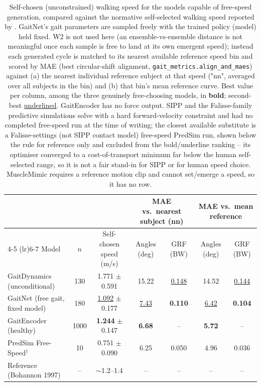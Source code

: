 \begin{table}[t]
\centering
\caption{Self-chosen (unconstrained) walking speed for the models capable of
free-speed generation, compared against the normative self-selected walking
speed reported by \citet{bohannon1997}. GaitNet's gait parameters are sampled
freely with the trained policy (model) held fixed. W2 is not used here (an
ensemble-vs-ensemble distance is not meaningful once each sample is free to
land at its own emergent speed); instead each generated cycle is matched to
its nearest available reference speed bin and scored by MAE (best
circular-shift alignment, \texttt{gait\_metrics.align\_and\_maes}) against (a)
the nearest individual reference subject at that speed ("nn", averaged over
all subjects in the bin) and (b) that bin's mean reference curve. Best value
per column, among the three genuinely free-choosing models, in \textbf{bold};
second-best \underline{underlined}. GaitEncoder has no force output. SIPP and
the Falisse-family predictive simulations solve with a hard forward-velocity
constraint and had no completed free-speed run at the time of writing; the
closest available substitute is a Falisse-settings (not SIPP contact model)
free-speed PredSim run, shown below the rule for reference only and excluded
from the bold/underline ranking -- its optimiser converged to a
cost-of-transport minimum far below the human self-selected range, so it is
not a fair stand-in for SIPP or for human speed choice. MuscleMimic requires a
reference motion clip and cannot set/emerge a speed, so it has no row.}
\label{tab:emd_selfchosen}
\begin{tabular}{lcccccc}
\toprule
 & & & \multicolumn{2}{c}{MAE vs.\ nearest subject (nn)} & \multicolumn{2}{c}{MAE vs.\ mean reference} \\
\cmidrule(lr){4-5} \cmidrule(lr){6-7}
Model & $n$ & Self-chosen speed (m/s) & Angles (deg) & GRF (BW) & Angles (deg) & GRF (BW) \\
\midrule
GaitDynamics (unconditional)      & 130  & 1.771 $\pm$ 0.591 & 15.22 & \underline{0.148} & 14.52 & \underline{0.144} \\
GaitNet (free gait, fixed model)  & 180  & \underline{1.092} $\pm$ 0.177 & \underline{7.43} & \textbf{0.110} & \underline{6.42} & \textbf{0.104} \\
GaitEncoder (healthy)             & 1000 & \textbf{1.244} $\pm$ 0.147 & \textbf{6.68} & --    & \textbf{5.72} & --    \\
\midrule
PredSim Free-Speed$^\dagger$      & 10   & 0.751 $\pm$ 0.090 & 6.25  & 0.050 & 4.96  & 0.036 \\
Reference (Bohannon 1997)         & --   & $\sim$1.2--1.4     & --    & --    & --    & --    \\
\bottomrule
\end{tabular}
\end{table}

